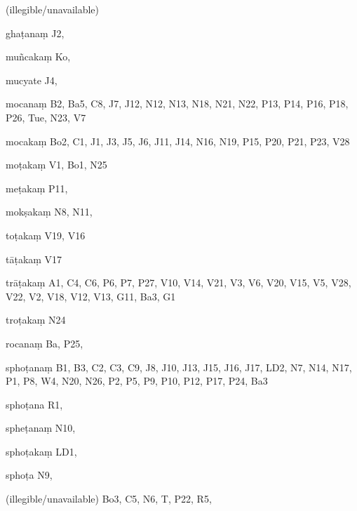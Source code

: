 \begin{ekdosis}
\begin{marma}[hp01_055]
\begin{marma}[hp02_009]
\begin{marma}[hp02_011]
\begin{marma}[hp02_30c]
\begin{description}
    \end{description}
 \end{marma}

 \begin{marma}[hp02_31cd]
\item[] 
\item[(illegible/unavailable)] 
  \begin{description}

    \end{description}
 \end{marma}

 \begin{marma}[hp02_33a]
\item[ghaṭanaṃ] J2, 
\item[muñcakaṃ] Ko,
\item[mucyate] J4,
\item[mocanaṃ] B2, Ba5, C8, J7, J12, N12, N13, N18, N21, N22, P13, P14, P16, P18, P26, Tue, N23, V7
\item[mocakaṃ] Bo2, C1, J1, J3, J5, J6, J11, J14, N16, N19, P15, P20, P21, P23, V28
\item[moṭakaṃ] V1, Bo1, N25 
\item[meṭakaṃ] P11, 
\item[mokṣakaṃ] N8, N11, 
\item[toṭakaṃ] V19, V16
\item[tāṭakaṃ] V17
\item[trāṭakaṃ] A1, C4, C6, P6, P7, P27, V10, V14, V21, V3, V6, V20, V15, V5, V28, V22, V2, V18, V12, V13, G11, Ba3, G1
\item[troṭakaṃ] N24
\item[rocanaṃ] Ba, P25, 
\item[sphoṭanaṃ] B1, B3, C2, C3, C9, J8, J10, J13, J15, J16, J17, LD2, N7, N14, N17, P1, P8, W4, N20, N26, P2, P5, P9, P10, P12, P17, P24, Ba3  
\item[sphoṭana] R1,
\item[spheṭanaṃ] N10,
\item[sphoṭakaṃ] LD1,
\item[sphoṭa] N9, 
\item[(illegible/unavailable)] Bo3, C5, N6, T, P22, R5,
  \begin{description}

    \end{description}
 \end{marma}


\end{marma}
\end{marma}
\end{marma}
\end{ekdosis}

